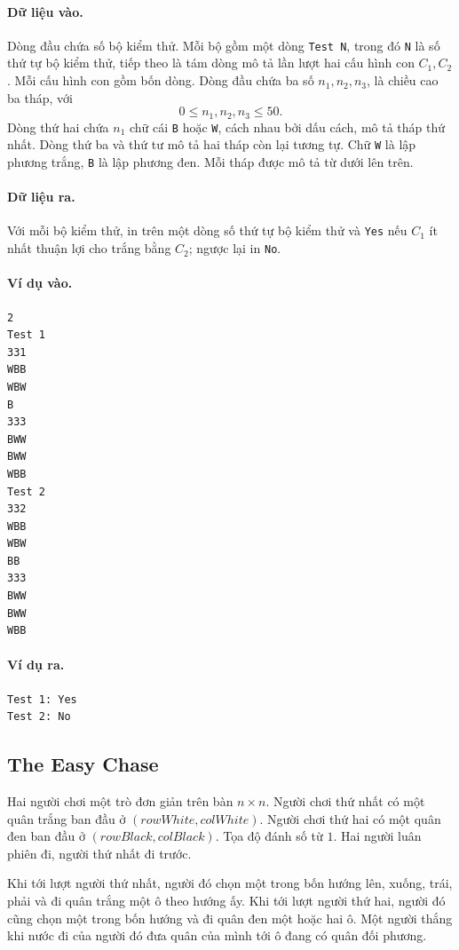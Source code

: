 \documentclass[11pt]{article}
\begin{document}
\paragraph{Dữ liệu vào.}
Dòng đầu chứa số bộ kiểm thử. Mỗi bộ gồm một dòng \texttt{Test N}, trong đó
\texttt{N} là số thứ tự bộ kiểm thử, tiếp theo là tám dòng mô tả lần lượt hai
cấu hình con \(C_1,C_2\). Mỗi cấu hình con gồm bốn dòng. Dòng đầu chứa ba số
\(n_1,n_2,n_3\), là chiều cao ba tháp, với
\[
  0\le n_1,n_2,n_3\le 50.
\]
Dòng thứ hai chứa \(n_1\) chữ cái \texttt{B} hoặc \texttt{W}, cách nhau bởi
dấu cách, mô tả tháp thứ nhất. Dòng thứ ba và thứ tư mô tả hai tháp còn lại
tương tự. Chữ \texttt{W} là lập phương trắng, \texttt{B} là lập phương đen.
Mỗi tháp được mô tả từ dưới lên trên.

\paragraph{Dữ liệu ra.}
Với mỗi bộ kiểm thử, in trên một dòng số thứ tự bộ kiểm thử và \texttt{Yes}
nếu \(C_1\) ít nhất thuận lợi cho trắng bằng \(C_2\); ngược lại in
\texttt{No}.

\paragraph{Ví dụ vào.}
\begin{verbatim}
2
Test 1
331
WBB
WBW
B
333
BWW
BWW
WBB
Test 2
332
WBB
WBW
BB
333
BWW
BWW
WBB
\end{verbatim}

\paragraph{Ví dụ ra.}
\begin{verbatim}
Test 1: Yes
Test 2: No
\end{verbatim}

\subsection{The Easy Chase}

Hai người chơi một trò đơn giản trên bàn \(n\times n\). Người chơi thứ nhất có
một quân trắng ban đầu ở \((\mathit{rowWhite},\mathit{colWhite})\). Người chơi
thứ hai có một quân đen ban đầu ở
\((\mathit{rowBlack},\mathit{colBlack})\). Tọa độ đánh số từ \(1\). Hai người
luân phiên đi, người thứ nhất đi trước.

Khi tới lượt người thứ nhất, người đó chọn một trong bốn hướng lên, xuống,
trái, phải và đi quân trắng một ô theo hướng ấy. Khi tới lượt người thứ hai,
người đó cũng chọn một trong bốn hướng và đi quân đen một hoặc hai ô. Một
người thắng khi nước đi của người đó đưa quân của mình tới ô đang có quân đối
phương.
\end{document}
